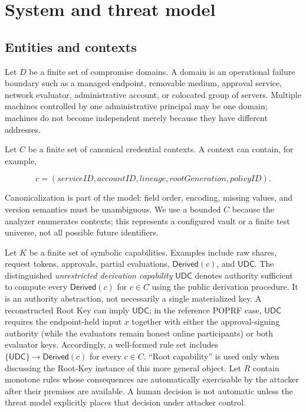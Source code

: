 \documentclass[preprint,12pt]{elsarticle}
\newcommand{\UDC}{\mathsf{UDC}}
\newcommand{\Derived}{\mathsf{Derived}}
\begin{document}
\section{System and threat model}

\subsection{Entities and contexts}

Let $D$ be a finite set of compromise domains.  A domain is an operational
failure boundary such as a managed endpoint, removable medium, approval
service, network evaluator, administrative account, or colocated group of
servers.  Multiple machines controlled by one administrative principal may be
one domain; machines do not become independent merely because they have
different addresses.

Let $C$ be a finite set of canonical credential contexts.  A context can
contain, for example,

\[
c=(\mathit{serviceID},\mathit{accountID},\mathit{lineage},
   \mathit{rootGeneration},\mathit{policyID}).
\]

Canonicalization is part of the model: field order, encoding, missing values,
and version semantics must be unambiguous.  We use a bounded $C$ because the
analyzer enumerates contexts; this represents a configured vault or a finite
test universe, not all possible future identifiers.

Let $K$ be a finite set of symbolic capabilities.  Examples include raw shares,
request tokens, approvals, partial evaluations, $\Derived(c)$, and $\UDC$.
The distinguished \emph{unrestricted derivation capability} $\UDC$ denotes
authority sufficient to compute every $\Derived(c)$ for $c\in C$ using the
public derivation procedure.  It is an authority abstraction, not necessarily
a single materialized key.  A reconstructed Root Key can imply $\UDC$; in the
reference POPRF case, $\UDC$ requires the endpoint-held input $x$ together
with either the approval-signing authority (while the evaluators remain honest
online participants) or both evaluator keys.
Accordingly, a well-formed rule set includes
$\{\UDC\}\rightarrow\Derived(c)$ for every $c\in C$.  ``Root capability'' is
used only when discussing the Root-Key instance of this more general object.
Let $R$ contain monotone rules whose consequences are automatically
exercisable by the attacker after their premises are available.  A human
decision is not automatic unless the threat model explicitly places that
decision under attacker control.
\end{document}

